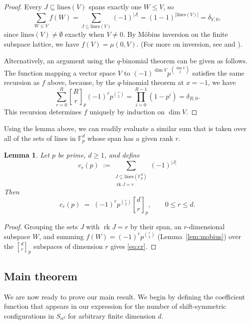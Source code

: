 \documentclass[11pt,a4paper]{article}
\newtheorem{lemma}[theorem]{Lemma}
\theoremstyle{remark}
\DeclareMathOperator{\rk}{rk}
\newcommand{\FF}{\mathbb{F}}
\newcommand{\gaussbinom}[2]{\genfrac{[}{]}{0pt}{}{#1}{#2}}
\begin{document}
\begin{proof}
Every $J\subseteq\mathrm{lines}(V)$ spans exactly one $W\le V$, so
\[\sum_{W\le V}f(W)=\sum_{J\subseteq\mathrm{lines}(V)}(-1)^{|J|}
=(1-1)^{|\mathrm{lines}(V)|}=\delta_{V,0},\] since
$\mathrm{lines}(V)\neq\emptyset$ exactly when $V\neq0$. By M\"obius inversion
on the finite subspace lattice, we have $f(V)=\mu(0,V)$. (For more on inversion, see \cite[Prop.~3.7.1]{stanley2012} and \cite[\S4.1.2]{kerber1999}). 

Alternatively, an argument using the $q$-binomial theorem \cite[Eq.~(1.87)]{stanley2012} can be given as follows.  The function mapping a vector space $V$ to
$(-1)^{\dim V}p^{\binom{\dim V}2}$ satisfies the same recursion as $f$ above,
because, by the $q$-binomial theorem  at $x=-1$, we have
\[\sum_{r=0}^{R}\gaussbinom Rr_p(-1)^r p^{\binom r2}
=\prod_{i=0}^{R-1}(1-p^i)=\delta_{R,0}.\]
 This recursion determines $f$ uniquely by induction on $\dim V$. 
\end{proof}

Using the lemma above, we can readily evaluate a similar sum that is taken over all of the sets of lines in $\FF_p^d$ whose span has a given rank $r$.

\begin{lemma}\label{lem:mobius2}
Let $p$ be prime, $d\ge1$, and define 
\[
  c_r(p)\;:=\!\!\sum_{\substack{J\subseteq\mathrm{lines}(\FF_p^d)\\
  \rk J=r}}\!\!(-1)^{|J|}
\]
Then
\begin{equation}\label{eq:cr}
  c_r(p) 
  \;=\;(-1)^r p^{\binom r2}\gaussbinom dr_p ,\qquad 0\le r\le d .
\end{equation}
\end{lemma}

\begin{proof}
Grouping the sets $J$ with $\rk J=r$ by their span, an $r$-dimensional subspace $W$, and
summing $f(W)=(-1)^r p^{\binom r2}$ (Lemma~\ref{lem:mobius}) over the $\gaussbinom dr_p$ subspaces of dimension $r$ gives
\eqref{eq:cr}.
\end{proof}

\subsection{Main theorem}

We are now ready to prove our main result. We begin by defining the coefficient function that appears in our expression for the number of shift-symmetric configurations in $S_{n^d}$ for arbitrary finite dimension $d$.
\end{document}
